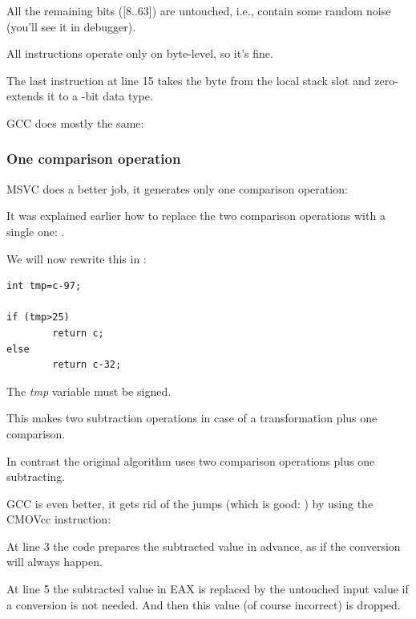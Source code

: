 All the remaining bits ([8..63]) are untouched, i.e., contain some random noise (you'll see it in debugger).

All instructions operate only on byte-level, so it's fine.

The last  instruction at line 15 takes the byte from the local stack slot and zero-extends it to a -bit data type.

\NonOptimizing GCC does mostly the same:



\subsubsection{One comparison operation}
\label{toupper_one_comparison}

\Optimizing MSVC does a better job, it generates only one comparison operation:



It was explained earlier how to replace the two comparison operations with a single one: .

We will now rewrite this in \CCpp:

\begin{lstlisting}[style=customc]
int tmp=c-97;

if (tmp>25)
        return c;
else
        return c-32;
\end{lstlisting}

The \emph{tmp} variable must be signed.

This makes two subtraction operations in case of a transformation plus one comparison.

In contrast the original algorithm uses two comparison operations plus one subtracting.

\Optimizing GCC is even better, it gets rid of the jumps (which is good: ) 
by using the CMOVcc instruction:



At line 3 the code prepares the subtracted value in advance, as if the conversion will always happen.

At line 5 the subtracted value in EAX is replaced by the untouched input value if a conversion is not needed.
And then this value (of course incorrect) is dropped.

